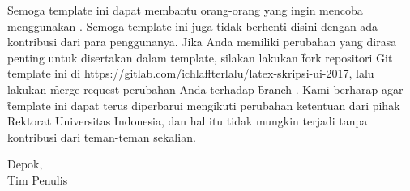 Semoga template ini dapat membantu orang-orang yang ingin mencoba menggunakan \latex.
Semoga template ini juga tidak berhenti disini dengan ada kontribusi dari para penggunanya.
Jika Anda memiliki perubahan yang dirasa penting untuk disertakan dalam template, silakan lakukan \f{fork} repositori Git template ini di \url{https://gitlab.com/ichlaffterlalu/latex-skripsi-ui-2017}, lalu lakukan \f{merge request} perubahan Anda terhadap \f{branch} .
Kami berharap agar \f{template} ini dapat terus diperbarui mengikuti perubahan ketentuan dari pihak Rektorat Universitas Indonesia, dan hal itu tidak mungkin terjadi tanpa kontribusi dari teman-teman sekalian.


\vspace*{0.1cm}
\begin{flushright}
Depok, \tanggalSiapSidang\\[0.1cm]
\ifx\blank\npmDua
	\vspace*{1.5cm}
	\penulisSatu
\else
	Tim Penulis
\fi

\end{flushright}
